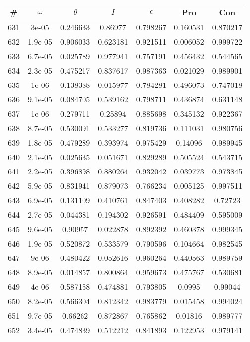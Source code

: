 \newpage
\begin{table}
\begin{tabular}{c|c|c|c|c|c|c}
\# & $\omega$ & $\theta$ & $I$ & $\epsilon$ & Pro & Con\\
\hline
631 & 3e-05 & 0.246633 & 0.86977 & 0.798267 & 0.160531 & 0.870217\\
632 & 1.9e-05 & 0.906033 & 0.623181 & 0.921511 & 0.006052 & 0.999722\\
633 & 6.7e-05 & 0.025789 & 0.977941 & 0.757191 & 0.456432 & 0.544565\\
634 & 2.3e-05 & 0.475217 & 0.837617 & 0.987363 & 0.021029 & 0.989901\\
635 & 1e-06 & 0.138388 & 0.015977 & 0.784281 & 0.496073 & 0.747018\\
636 & 9.1e-05 & 0.084705 & 0.539162 & 0.798711 & 0.436874 & 0.631148\\
637 & 1e-06 & 0.279711 & 0.25894 & 0.885698 & 0.345132 & 0.922367\\
638 & 8.7e-05 & 0.530091 & 0.533277 & 0.819736 & 0.111031 & 0.980756\\
639 & 1.8e-05 & 0.479289 & 0.393974 & 0.975429 & 0.14096 & 0.989945\\
640 & 2.1e-05 & 0.025635 & 0.051671 & 0.829289 & 0.505524 & 0.543715\\
641 & 2.2e-05 & 0.396898 & 0.880264 & 0.932042 & 0.039773 & 0.973845\\
642 & 5.9e-05 & 0.831941 & 0.879073 & 0.766234 & 0.005125 & 0.997511\\
643 & 6.9e-05 & 0.131109 & 0.410761 & 0.847403 & 0.408282 & 0.72723\\
644 & 2.7e-05 & 0.044381 & 0.194302 & 0.926591 & 0.484409 & 0.595009\\
645 & 9.6e-05 & 0.90957 & 0.022878 & 0.892392 & 0.460378 & 0.999345\\
646 & 1.9e-05 & 0.520872 & 0.533579 & 0.790596 & 0.104664 & 0.982545\\
647 & 9e-06 & 0.480422 & 0.052616 & 0.960264 & 0.440563 & 0.989759\\
648 & 8.9e-05 & 0.014857 & 0.800864 & 0.959673 & 0.475767 & 0.530681\\
649 & 4e-06 & 0.587158 & 0.474881 & 0.793805 & 0.0995 & 0.99044\\
650 & 8.2e-05 & 0.566304 & 0.812342 & 0.983779 & 0.015458 & 0.994024\\
651 & 9.7e-05 & 0.66262 & 0.872867 & 0.765862 & 0.01816 & 0.989777\\
652 & 3.4e-05 & 0.474839 & 0.512212 & 0.841893 & 0.122953 & 0.979141\\

\end{tabular}
\end{table}
